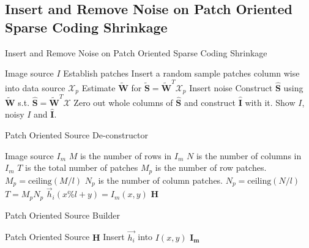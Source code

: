 \documentclass[12pt ]{article}
\begin{document}
\subsection{Insert and Remove Noise on Patch Oriented Sparse Coding Shrinkage}


\begin{algorithm}
\caption{Insert and Remove Noise on Patch Oriented Sparse Coding Shrinkage}
\label{alg:patch-oriented-sparse-coding-shrinkage-with-source}
\begin{algorithmic}
	\REQUIRE Image source $I$
	\STATE Establish patches
	\STATE Insert a random sample patches column wise into data source $\mathbf{\mathcal{X}}_p$
	\STATE Estimate $\mathbf{\tilde{W}}$ for $\mathbf{\tilde{S}} = \mathbf{\tilde{W}}^T \mathbf{\mathcal{X}}_p$
	\STATE Insert noise
	\STATE Construct $\mathbf{\hat{S}}$ using $\mathbf{\tilde{W}}$ s.t. $\mathbf{\hat{S}} = \mathbf{\tilde{W}}^T \mathbf{\mathcal{X}}$
	\STATE Zero out whole columns of $\mathbf{\hat{S}}$ and construct $\mathbf{\hat{I}}$ with it. 
	\STATE Show $I$, noisy $I$ and $\mathbf{\hat{I}}$.
\end{algorithmic}
\end{algorithm}



\begin{algorithm}
\caption{Patch Oriented Source De-constructor}
\label{alg:Patch-Oriented-Source-Builder}
\begin{algorithmic}
	\REQUIRE Image source $I_m$
	\STATE $M$ is the number of rows in $I_m$
	\STATE $N$ is the number of columns in $I_m$
	\STATE $T$ is the total number of patches
	\STATE $M_p$ is the number of row patches. $M_p = \textrm{ceiling}(M / l)$
	\STATE $N_p$ is the number of column patches. $N_p = \textrm{ceiling}(N / l)$
	\STATE $T = M_p N_p$
				\STATE $\vec{h}_i (x\% l +y) = I_m(x,y)$
			\ENDFOR
		\ENDFOR 
	\ENDFOR
	\RETURN $\mathbf{H}$
\end{algorithmic}
\end{algorithm}

\begin{algorithm}
\caption{Patch Oriented Source Builder}
\label{alg:Patch-Oriented-Source-Builder}
\begin{algorithmic}
	\REQUIRE Patch Oriented Source $\mathbf{H}$
			\STATE Insert $\vec{h_i}$ into $I(x,y)$
		\ENDFOR
	\ENDFOR
	\RETURN $\mathbf{I_m}$
\end{algorithmic}
\end{algorithm}
\end{document}

